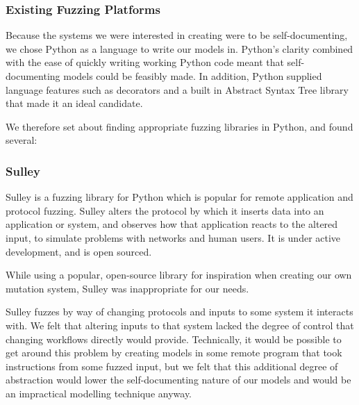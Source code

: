 \documentclass{sig-alternate}
\begin{document}
\subsubsection{Existing Fuzzing Platforms}
\label{research_fuzzing}
Because the systems we were interested in creating were to be self-documenting, we chose Python as a language to write our models in. Python's clarity combined with the ease of quickly writing working Python code meant that self-documenting models could be feasibly made. In addition, Python supplied language features such as decorators and a built in Abstract Syntax Tree library that made it an ideal candidate. \par
We therefore set about finding appropriate fuzzing libraries in Python, and found several:
\subsubsection{Sulley}
\label{fuzzing_sulley}
Sulley is a fuzzing library for Python which is popular for remote application and protocol fuzzing. Sulley alters the protocol by which it inserts data into an application or system, and observes how that application reacts to the altered input, to simulate problems with networks and human users. It is under active development, and is open sourced.\par
While using a popular, open-source library for inspiration when creating our own mutation system, Sulley was inappropriate for our needs.\par
Sulley fuzzes by way of changing protocols and inputs to some system it interacts with. We felt that altering inputs to that system lacked the degree of control that changing workflows directly would provide. Technically, it would be possible to get around this problem by creating models in some remote program that took instructions from some fuzzed input, but we felt that this additional degree of abstraction would lower the self-documenting nature of our models and would be an impractical modelling technique anyway. \par
\end{document}
